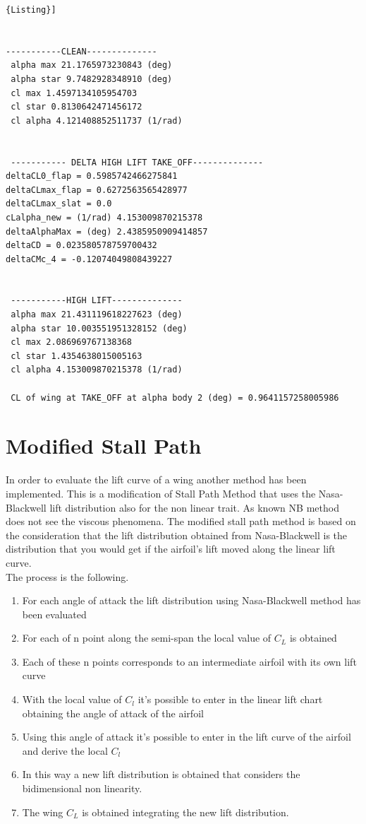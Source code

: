 \begin{lstlisting}[caption={{\footnotesize Wing Lift characteristic results for TAKE-OFF. BOEING 747-100B, M=0.2 }},label= [style=\bfseries]{Listing}]


-----------CLEAN-------------- 
 alpha max 21.1765973230843 (deg)
 alpha star 9.7482928348910 (deg)
 cl max 1.4597134105954703
 cl star 0.8130642471456172
 cl alpha 4.121408852511737 (1/rad)


 ----------- DELTA HIGH LIFT TAKE_OFF-------------- 
deltaCL0_flap = 0.5985742466275841
deltaCLmax_flap = 0.6272563565428977
deltaCLmax_slat = 0.0
cLalpha_new = (1/rad) 4.153009870215378
deltaAlphaMax = (deg) 2.4385950909414857
deltaCD = 0.023580578759700432
deltaCMc_4 = -0.12074049808439227


 -----------HIGH LIFT-------------- 
 alpha max 21.431119618227623 (deg)
 alpha star 10.003551951328152 (deg)
 cl max 2.086969767138368
 cl star 1.4354638015005163
 cl alpha 4.153009870215378 (1/rad)
 
 CL of wing at TAKE_OFF at alpha body 2 (deg) = 0.9641157258005986
\end{lstlisting}

\section{Modified Stall Path}

In order to evaluate the lift curve of a wing another method has been implemented. This is a modification of Stall Path Method that uses the Nasa-Blackwell lift distribution also for the non linear trait. As known NB method does not see the viscous phenomena. The modified stall path method is based on the consideration that the lift distribution obtained from Nasa-Blackwell is the distribution that you would get if the airfoil's lift moved along the linear lift curve.\\
The process is the following.

\begin{enumerate}
	\item For each angle of attack the lift distribution using Nasa-Blackwell method has been evaluated
	\item For each of n point along the semi-span the local value of $C_L$ is obtained 
	\item Each of these n points corresponds to an intermediate airfoil with its own lift curve
	\item With the local value of $C_l$  it's possible to enter in the linear lift chart obtaining the angle of attack of the airfoil
	\item Using this angle of attack it's possible to enter in the lift curve of the airfoil and derive the local $C_l$
	\item In this way a new lift distribution is obtained that considers the bidimensional non linearity.
	\item The wing $C_L$ is obtained integrating the new lift distribution.
\end{enumerate}


